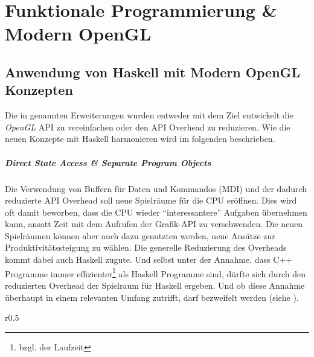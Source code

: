\chapter{Funktionale Programmierung \& Modern OpenGL}
\label{chap:haskell-modern-gl}

\begingroup
\section{Anwendung von Haskell mit Modern OpenGL Konzepten}\label{sec:haskell-gl-anwendung}

Die in  genannten Erweiterungen wurden entweder mit dem Ziel entwickelt die \textit{OpenGL} \ac{API} zu vereinfachen oder den \ac{API} Overhead zu reduzieren. Wie die neuen Konzepte mit Haskell harmonieren wird im folgenden beschrieben.

\paragraph{Direct State Access \& Separate Program Objects} Die Verwendung von Buffern für Daten und Kommandos (\ac{MDI}) und der dadurch reduzierte API Overhead soll neue Spielräume für die CPU eröffnen. Dies wird oft damit beworben, dass die CPU wieder "`interessantere"' Aufgaben übernehmen kann, ansatt Zeit mit dem Aufrufen der Grafik-\ac{API} zu verschwenden. Die neuen Spielräumen können aber auch dazu genutzten werden, neue Ansätze zur Produktivitätssteigung zu wählen. Die generelle Reduzierung des Overheads kommt dabei auch Haskell zugute. Und selbst unter der Annahme, dass C++ Programme immer effizienter\footnote{bzgl. der Laufzeit} als Haskell Programme sind, dürfte sich durch den reduzierten Overhead der Spielraum für Haskell ergeben. Und ob diese Annahme überhaupt in einem relevanten Umfang zutrifft, darf bezweifelt werden (siehe ).

\begin{wrapfigure}{r}{0.5\linewidth}
\centering
{}
\end{wrapfigure}

